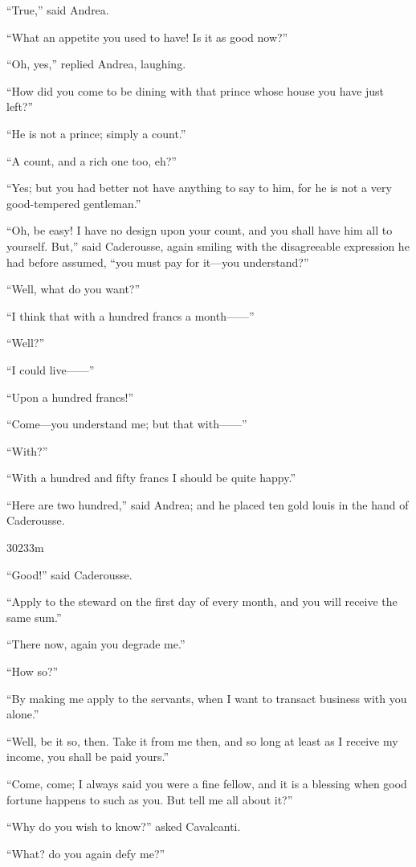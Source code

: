 “True,” said Andrea.

“What an appetite you used to have! Is it as good now?”

“Oh, yes,” replied Andrea, laughing.

“How did you come to be dining with that prince whose house you have
just left?”

“He is not a prince; simply a count.”

“A count, and a rich one too, eh?”

“Yes; but you had better not have anything to say to him, for he is not
a very good-tempered gentleman.”

“Oh, be easy! I have no design upon your count, and you shall have him
all to yourself. But,” said Caderousse, again smiling with the
disagreeable expression he had before assumed, “you must pay for it—you
understand?”

“Well, what do you want?”

“I think that with a hundred francs a month——”

“Well?”

“I could live——”

“Upon a hundred francs!”

“Come—you understand me; but that with——”

“With?”

“With a hundred and fifty francs I should be quite happy.”

“Here are two hundred,” said Andrea; and he placed ten gold louis in
the hand of Caderousse.

30233m



“Good!” said Caderousse.

“Apply to the steward on the first day of every month, and you will
receive the same sum.”

“There now, again you degrade me.”

“How so?”

“By making me apply to the servants, when I want to transact business
with you alone.”

“Well, be it so, then. Take it from me then, and so long at least as I
receive my income, you shall be paid yours.”

“Come, come; I always said you were a fine fellow, and it is a blessing
when good fortune happens to such as you. But tell me all about it?”

“Why do you wish to know?” asked Cavalcanti.

“What? do you again defy me?”

